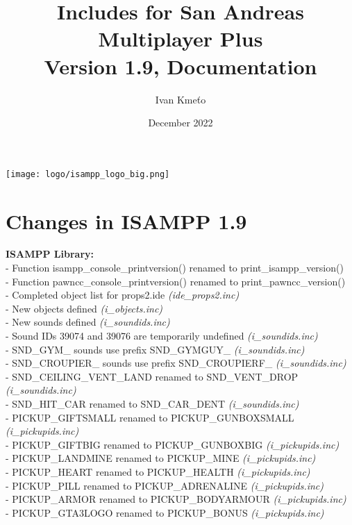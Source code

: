 \documentclass{article}
\title{Includes for San Andreas Multiplayer Plus\\Version 1.9, Documentation}
\author{Ivan Kmeťo}
\date{December 2022}
\begin{document}
\maketitle
\begin{center}
\texttt{[image: logo/isampp\_logo\_big.png]}
\end{center}

\newpage
\tableofcontents

\newpage
\section{Changes in ISAMPP 1.9}
\textbf{ISAMPP Library:}
\\- Function isampp\_console\_printversion() renamed to print\_isampp\_version()
\\- Function pawncc\_console\_printversion() renamed to print\_pawncc\_version()
\\- Completed object list for props2.ide \textit{(ide\_props2.inc)}
\\- New objects defined \textit{(i\_objects.inc)}
\\- New sounds defined \textit{(i\_soundids.inc)}
\\- Sound IDs 39074 and 39076 are temporarily undefined \textit{(i\_soundids.inc)}
\\- SND\_GYM\_ sounds use prefix SND\_GYMGUY\_ \textit{(i\_soundids.inc)}
\\- SND\_CROUPIER\_ sounds use prefix SND\_CROUPIERF\_ \textit{(i\_soundids.inc)}
\\- SND\_CEILING\_VENT\_LAND renamed to SND\_VENT\_DROP \textit{(i\_soundids.inc)}
\\- SND\_HIT\_CAR renamed to SND\_CAR\_DENT \textit{(i\_soundids.inc)}
\\- PICKUP\_GIFTSMALL renamed to PICKUP\_GUNBOXSMALL \textit{(i\_pickupids.inc)}
\\- PICKUP\_GIFTBIG renamed to PICKUP\_GUNBOXBIG \textit{(i\_pickupids.inc)}
\\- PICKUP\_LANDMINE renamed to PICKUP\_MINE \textit{(i\_pickupids.inc)}
\\- PICKUP\_HEART renamed to PICKUP\_HEALTH \textit{(i\_pickupids.inc)}
\\- PICKUP\_PILL renamed to PICKUP\_ADRENALINE \textit{(i\_pickupids.inc)}
\\- PICKUP\_ARMOR renamed to PICKUP\_BODYARMOUR \textit{(i\_pickupids.inc)}
\\- PICKUP\_GTA3LOGO renamed to PICKUP\_BONUS \textit{(i\_pickupids.inc)}
\end{document}
